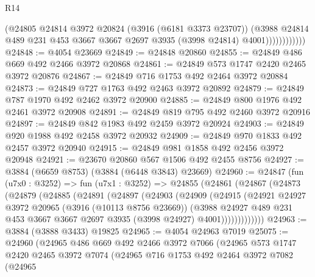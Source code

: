 \begin{lexlean}{R14}
\begin{coremodule}
                        (@24805
                          @24814
                          @3972
                          @20824
                          (@3916 (@6181 @3373 @23707))
                          (@3988
                            @24814
                            @489
                            @231
                            @453
                            @3667
                            @3667
                            @2697
                            @3935
                            (@3998 @24814)
                            @4001))))))))))))
@24848 := @4054 @23669
@24849 := @24848 @20860
@24855 := @24849 @486 @669 @492 @2466 @3972 @20868
@24861 := @24849 @573 @1747 @2420 @2465 @3972 @20876
@24867 := @24849 @716 @1753 @492 @2464 @3972 @20884
@24873 := @24849 @727 @1763 @492 @2463 @3972 @20892
@24879 := @24849 @787 @1970 @492 @2462 @3972 @20900
@24885 := @24849 @800 @1976 @492 @2461 @3972 @20908
@24891 := @24849 @819 @795 @492 @2460 @3972 @20916
@24897 := @24849 @842 @1983 @492 @2459 @3972 @20924
@24903 := @24849 @920 @1988 @492 @2458 @3972 @20932
@24909 := @24849 @970 @1833 @492 @2457 @3972 @20940
@24915 := @24849 @981 @1858 @492 @2456 @3972 @20948
@24921 := @23670 @20860 @567 @1506 @492 @2455 @8756
@24927 := @3884 (@6659 @8753) (@3884 (@6448 @3843) @23669)
@24960 := @24847
    (fun (u7x0 : @3252) =>
    fun (u7x1 : @3252) =>
    @24855
      (@24861
        (@24867
          (@24873
            (@24879
              (@24885
                (@24891
                  (@24897
                    (@24903
                      (@24909
                        (@24915
                          (@24921
                            @24927
                            @3972
                            @20965
                            (@3916 (@10113 @8756 @23669))
                            (@3988
                              @24927
                              @489
                              @231
                              @453
                              @3667
                              @3667
                              @2697
                              @3935
                              (@3998 @24927)
                              @4001)))))))))))))
@24963 := @3884 (@3888 @3433) @19825
@24965 := @4054 @24963 @7019
@25075 := @24960
    (@24965
      @486
      @669
      @492
      @2466
      @3972
      @7066
      (@24965
        @573
        @1747
        @2420
        @2465
        @3972
        @7074
        (@24965
          @716
          @1753
          @492
          @2464
          @3972
          @7082
          (@24965

\end{coremodule}
\end{lexlean}
